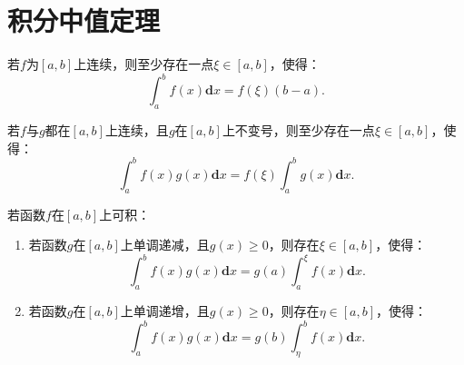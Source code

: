 \section{积分中值定理}

\begin{theorem}[积分第一中值定理]
	若$f$为$[a,b]$上连续，则至少存在一点$\xi\in[a,b]$，使得：
	\begin{equation}
		\int_{a}^{b} f(x)\textbf{d}x = f(\xi)(b-a).
	\end{equation}
\end{theorem}

\begin{corollary}[推广的积分第一中值定理]
	若$f$与$g$都在$[a,b]$上连续，且$g$在$[a,b]$上不变号，则至少存在一点$\xi\in[a,b]$，使得：
	\begin{equation}
		\int_{a}^{b}f(x)g(x)\textbf{d}x = f(\xi)\int_{a}^{b}g(x)\textbf{d}x.
	\end{equation}
\end{corollary}

\begin{theorem}[积分第二中值定理]
	若函数$f$在$[a,b]$上可积：
	\begin{enumerate}
		\item 若函数$g$在$[a,b]$上单调递减，且$g(x)\geq 0$，则存在$\xi\in[a,b]$，使得：
		\begin{equation}
			\int_{a}^{b}f(x)g(x)\textbf{d}x = g(a)\int_{a}^{\xi} f(x)\textbf{d}x.
		\end{equation}
		\item 若函数$g$在$[a,b]$上单调递增，且$g(x)\geq 0$，则存在$\eta\in[a,b]$，使得：
		\begin{equation}
			\int_{a}^{b}f(x)g(x)\textbf{d}x = g(b)\int_{\eta}^{b} f(x)\textbf{d}x.
		\end{equation}
	\end{enumerate}
\end{theorem}